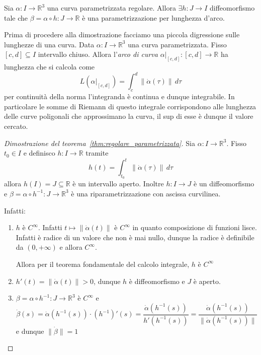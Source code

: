 \begin{theorem}\label{thm:regolare_parametrizzata}
    Sia \(\alpha : I \to \mathbb{R}^3\) una curva parametrizzata regolare.
    Allora \(\exists h : J \to I\) diffeomorfismo tale che \(\beta = \alpha
    \circ h : J \to \mathbb{R}\) è una parametrizzazione per lunghezza d'arco.
\end{theorem}
Prima di procedere alla dimostrazione facciamo una piccola digressione sulle
lunghezze di una curva. Data \(\alpha: I \to \mathbb{R}^3\) una curva
parametrizzata. Fisso \([c,d] \subseteq I \)  intervallo chiuso. Allora
l'\emph{arco di curva} \(\alpha|_{[c, d]} : [c, d] \to \mathbb{R}\) ha lunghezza
che si calcola come
\[
    L{(\alpha|_{[c,d]} )} = \int_{c}^{d} \|\dot{\alpha}{(\tau)}\| \,d \tau
\]
per continuità della norma l'integranda è continua e dunque
integrabile. In particolare le somme di Riemann di questo integrale
corrispondono alle lunghezza delle curve poligonali che approssimano la curva,
il sup di esse è dunque il valore cercato.

\begin{proof}[Dimostrazione del teorema~\ref{thm:regolare_parametrizzata}]
    Sia \(\alpha : I\to \mathbb{R}^3\). Fisso \(t_{0} \in I\) e definisco \(h :
    I \to \mathbb{R}\) tramite
    \[
      h{(t)} = \int_{t_{0}}^{t} \|\dot{\alpha}{(\tau)}\| \,d \tau
    \]
    allora \(h{(I)} = J \subseteq \mathbb{R}  \) è un intervallo aperto. Inoltre
    \(h : I \to J\) è un diffeomorfismo e \(\beta = \alpha \circ h^{-1} : J \to
    \mathbb{R}^3\) è una riparametrizzazione con ascissa curvilinea.

    Infatti:
\begin{enumerate}[label = \arabic*.]
    \item \(h\) è \(C^{\infty}\). Infatti \(t \mapsto \|\dot{\alpha}{(t)}\|\) è
        \(C^{\infty}\) in quanto composizione di funzioni lisce. Infatti è
        radice di un valore che non è mai nullo, dunque la radice è definibile
        da \({(0, +\infty)}\) e allora \(C^{\infty}\).

        Allora per il teorema fondamentale del calcolo integrale, \(h\) è
        \(C^{\infty}\) 
    \item \(h'{(t)} = \|\dot{\alpha}{(t)}\| > 0\), dunque \(h\) è diffeomorfismo
        e \(J\) è aperto.
    \item \(\beta = \alpha \circ h^{-1} : J \to \mathbb{R}^3\) è \(C^{\infty}\)
        e
        \[
            \dot{\beta}{(s)} = \dot{\alpha}{(h^{-1}{(s)})} \cdot
            {(h^{-1})}'{(s)} =
            \frac{\dot{\alpha}{(h^{-1}{(s)})}}{h'{(h^{-1}{(s)})}} =
            \frac{\dot{\alpha}{(h^{-1}{(s)})}}{\|\dot{\alpha}{(h^{-1}{(s)})}\|}
        \]
        e dunque \(\|\dot{\beta}\| = 1\) 
\end{enumerate}
\end{proof}

